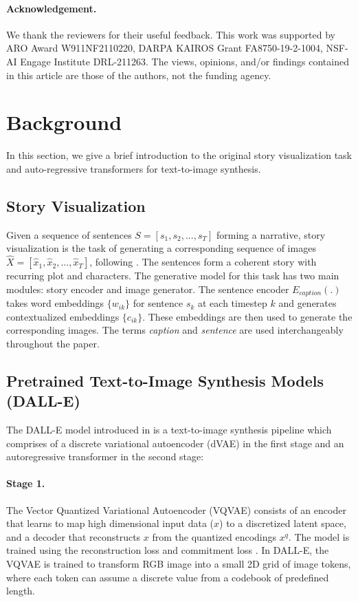 \documentclass[runningheads]{llncs}
\begin{document}
\paragraph{Acknowledgement.} We thank the reviewers for their useful feedback. This work was supported by ARO Award W911NF2110220, DARPA KAIROS Grant FA8750-19-2-1004, NSF-AI Engage Institute DRL-211263. The views, opinions, and/or findings contained in this article are those of the authors, not the funding agency.






\appendix{}


\section{Background}
In this section, we give a brief introduction to the original story visualization task and auto-regressive transformers for text-to-image synthesis.

\subsection{Story Visualization}
\label{sec:sviz}
Given a sequence of sentences $S=[s_1, s_2, ..., s_T]$ forming a narrative, story visualization is the task of generating a corresponding sequence of images $\hat{X} = [\hat{x}_1, \hat{x}_2, ..., \hat{x}_T]$, following \cite{li2019storygan}. The sentences form a coherent story with recurring plot and characters. The generative model for this task has two main modules: story encoder and image generator. The sentence encoder $E_{caption}(.)$ takes word embeddings $\{w_{ik}\}$ for sentence $s_k$ at each timestep $k$ and generates contextualized embeddings $\{c_{ik}\}$. These embeddings are then used to generate the corresponding images. The terms \textit{caption} and \textit{sentence} are used interchangeably throughout the paper.


\subsection{Pretrained Text-to-Image Synthesis Models (DALL-E)}
The DALL-E model introduced in \cite{ramesh2021zero} is a text-to-image synthesis pipeline which comprises of a discrete variational autoencoder (dVAE) in the first stage and an autoregressive transformer in the second stage:

\paragraph{Stage 1.} The Vector Quantized Variational Autoencoder (VQVAE) \cite{van2016conditional} consists of an encoder that learns to map high dimensional input data ($x$) to a discretized latent space, and a decoder that reconstructs $x$ from the quantized encodings $x^{q}$. The model is trained using the reconstruction loss and commitment loss \cite{van2017neural}. In DALL-E, the VQVAE is trained to transform RGB image into a small 2D grid of image tokens, where each token can assume a discrete value from a codebook of predefined length.
\end{document}
